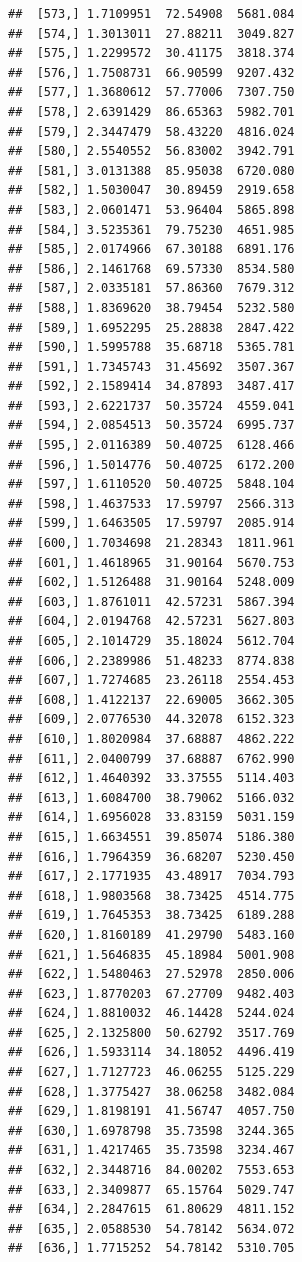 \documentclass[article]{jss}\usepackage[]{graphicx}\usepackage[]{xcolor}
\makeatletter
\newenvironment{kframe}{%
 \def\at@end@of@kframe{}%
 \ifinner\ifhmode%
  \def\at@end@of@kframe{\end{minipage}}%
  \begin{minipage}{\columnwidth}%
 \fi\fi%
 \def\FrameCommand##1{\hskip\@totalleftmargin \hskip-\fboxsep
 \colorbox{shadecolor}{##1}\hskip-\fboxsep
     \hskip-\linewidth \hskip-\@totalleftmargin \hskip\columnwidth}%
 \MakeFramed {\advance\hsize-\width
   \@totalleftmargin\z@ \linewidth\hsize
   \@setminipage}}%
 {\par\unskip\endMakeFramed%
 \at@end@of@kframe}
\newenvironment{knitrout}{}{} %
\makeatother
\begin{document}
\begin{knitrout}
\begin{kframe}
\begin{verbatim}
##  [573,] 1.7109951  72.54908  5681.084
##  [574,] 1.3013011  27.88211  3049.827
##  [575,] 1.2299572  30.41175  3818.374
##  [576,] 1.7508731  66.90599  9207.432
##  [577,] 1.3680612  57.77006  7307.750
##  [578,] 2.6391429  86.65363  5982.701
##  [579,] 2.3447479  58.43220  4816.024
##  [580,] 2.5540552  56.83002  3942.791
##  [581,] 3.0131388  85.95038  6720.080
##  [582,] 1.5030047  30.89459  2919.658
##  [583,] 2.0601471  53.96404  5865.898
##  [584,] 3.5235361  79.75230  4651.985
##  [585,] 2.0174966  67.30188  6891.176
##  [586,] 2.1461768  69.57330  8534.580
##  [587,] 2.0335181  57.86360  7679.312
##  [588,] 1.8369620  38.79454  5232.580
##  [589,] 1.6952295  25.28838  2847.422
##  [590,] 1.5995788  35.68718  5365.781
##  [591,] 1.7345743  31.45692  3507.367
##  [592,] 2.1589414  34.87893  3487.417
##  [593,] 2.6221737  50.35724  4559.041
##  [594,] 2.0854513  50.35724  6995.737
##  [595,] 2.0116389  50.40725  6128.466
##  [596,] 1.5014776  50.40725  6172.200
##  [597,] 1.6110520  50.40725  5848.104
##  [598,] 1.4637533  17.59797  2566.313
##  [599,] 1.6463505  17.59797  2085.914
##  [600,] 1.7034698  21.28343  1811.961
##  [601,] 1.4618965  31.90164  5670.753
##  [602,] 1.5126488  31.90164  5248.009
##  [603,] 1.8761011  42.57231  5867.394
##  [604,] 2.0194768  42.57231  5627.803
##  [605,] 2.1014729  35.18024  5612.704
##  [606,] 2.2389986  51.48233  8774.838
##  [607,] 1.7274685  23.26118  2554.453
##  [608,] 1.4122137  22.69005  3662.305
##  [609,] 2.0776530  44.32078  6152.323
##  [610,] 1.8020984  37.68887  4862.222
##  [611,] 2.0400799  37.68887  6762.990
##  [612,] 1.4640392  33.37555  5114.403
##  [613,] 1.6084700  38.79062  5166.032
##  [614,] 1.6956028  33.83159  5031.159
##  [615,] 1.6634551  39.85074  5186.380
##  [616,] 1.7964359  36.68207  5230.450
##  [617,] 2.1771935  43.48917  7034.793
##  [618,] 1.9803568  38.73425  4514.775
##  [619,] 1.7645353  38.73425  6189.288
##  [620,] 1.8160189  41.29790  5483.160
##  [621,] 1.5646835  45.18984  5001.908
##  [622,] 1.5480463  27.52978  2850.006
##  [623,] 1.8770203  67.27709  9482.403
##  [624,] 1.8810032  46.14428  5244.024
##  [625,] 2.1325800  50.62792  3517.769
##  [626,] 1.5933114  34.18052  4496.419
##  [627,] 1.7127723  46.06255  5125.229
##  [628,] 1.3775427  38.06258  3482.084
##  [629,] 1.8198191  41.56747  4057.750
##  [630,] 1.6978798  35.73598  3244.365
##  [631,] 1.4217465  35.73598  3234.467
##  [632,] 2.3448716  84.00202  7553.653
##  [633,] 2.3409877  65.15764  5029.747
##  [634,] 2.2847615  61.80629  4811.152
##  [635,] 2.0588530  54.78142  5634.072
##  [636,] 1.7715252  54.78142  5310.705

\end{verbatim}
\end{kframe}
\end{knitrout}
\end{document}
